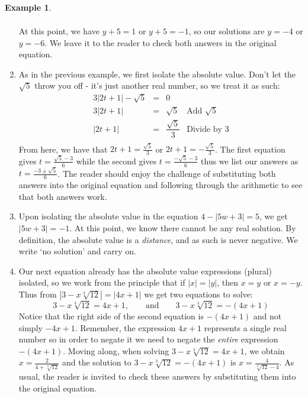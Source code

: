 \documentclass[11pt]{article}
\theoremstyle{definition}  %
\newtheorem{ex}{\bf Example}
\begin{document}
\begin{ex}
\begin{enumerate}
\[\begin{array}{rclr}
\end{array} \] At this point, we have $y+5 = 1$ or $y+5 = -1$, so our solutions are $y = -4$ or $y = -6$.  We leave it to the reader to check both answers in the original equation.

\item As in the previous example, we first isolate the absolute value.  Don't let the $\sqrt{5}$ throw you off - it's just another real number, so we treat it as such:\[ \begin{array}{rclr}

 3|2t+1| - \sqrt{5} & = & 0 & \\
 3|2t+1|  & = &  \sqrt{5} & \text{Add $\sqrt{5}$} \\
 |2t + 1| & = & \dfrac{\sqrt{5}}{3} & \text{Divide by $3$}\\
\end{array} \] From here, we have that $2t+1 = \frac{\sqrt{5}}{3}$ or $2t+1 = -\frac{\sqrt{5}}{3}$. The first equation gives $t = \frac{\sqrt{5}-3}{6}$ while the second gives $t = \frac{-\sqrt{5}-3}{6}$ thus we list our answers as $t = \frac{-3 \pm \sqrt{5}}{6}$.   The reader should enjoy the challenge of substituting both answers into the original equation and following through the arithmetic to see that both answers work.

\item  Upon isolating the absolute value in the equation $4 - |5w+3| = 5$, we get $|5w+3| = -1$.  At this point, we know there cannot be any real solution.  By definition, the absolute value is a \textit{distance}, and as such is never negative.  We write `no solution' and carry on.

\item Our next equation already has the absolute value expressions (plural) isolated, so we work from the principle that if $|x| = |y|$, then $x = y$ or $x = -y$. Thus from $\left|3 - x \sqrt[3]{12}\right| = |4x+1|$ we get two equations to solve:  \[ 3 - x \sqrt[3]{12} = 4x+1, \qquad \text{and} \qquad 3 - x \sqrt[3]{12} = -(4x+1) \] Notice that the right side of the second equation is $-(4x+1)$ and not simply $-4x+1$.  Remember, the expression $4x+1$ represents a single real number so in order to negate it we need to negate the \textit{entire} expression $-(4x+1)$. Moving along, when solving $3 - x \sqrt[3]{12} = 4x+1$, we obtain $x = \frac{2}{4 + \sqrt[3]{12}}$ and the solution to $3 - x \sqrt[3]{12} = -(4x+1)$ is $x = \frac{4}{\sqrt[3]{12}-4}$.  As usual, the reader is invited to check these answers by substituting them into the original equation.


\end{enumerate}
\end{ex}
\end{document}
